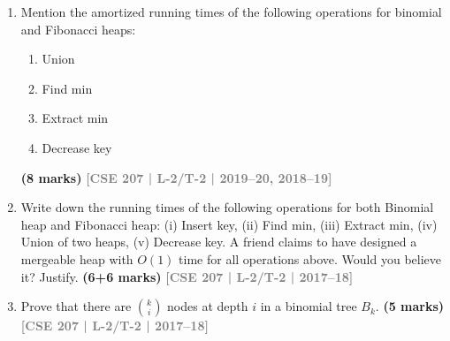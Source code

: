 \documentclass[12pt]{article}
\newcommand{\yr}[1]{\hfill\textcolor{gray}{\small\textbf{[#1]}}}
\newcommand{\mk}[1]{\textcolor{orange!70!black}{\small\textbf{(#1 marks)}}}
\begin{document}
\begin{enumerate}
\begin{center}
\end{center}

\mk{17} \yr{CSE 207 | L-2/T-2 | 2019--20}



\item Mention the amortized running times of the following operations for binomial and Fibonacci heaps:
\begin{enumerate}
  \item Union
  \item Find min
  \item Extract min
  \item Decrease key
\end{enumerate}
\mk{8} \yr{CSE 207 | L-2/T-2 | 2019--20, 2018--19}






\item Write down the running times of the following operations for both Binomial heap and Fibonacci heap: (i) Insert key, (ii) Find min, (iii) Extract min, (iv) Union of two heaps, (v) Decrease key. A friend claims to have designed a mergeable heap with $O(1)$ time for all operations above. Would you believe it? Justify. \mk{6+6}
\yr{CSE 207 | L-2/T-2 | 2017--18}



\item Prove that there are $\binom{k}{i}$ nodes at depth $i$ in a binomial tree $B_k$. \mk{5}
\yr{CSE 207 | L-2/T-2 | 2017--18}

\end{enumerate}
\end{document}
